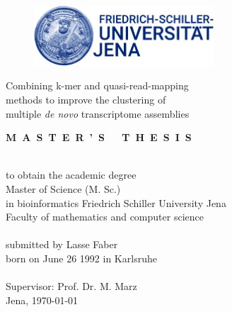 \documentclass[12pt,a4paper,english]{article}
\begin{document}
	\pagestyle{empty}
	\begin{titlepage}
		\begin{center}
			\begin{figure}[H]
				\centering
				\includegraphics[width=0.6\textwidth]{images/Logo-Paket_Uni_Jena/Logo_Uni_Jena/Bild-Wort-Marke/jpg/UniJena_BildWortMarke_blue.jpg}
			\end{figure}
	
			\vspace*{2cm}
			\begin{Large}
				Combining k-mer and quasi-read-mapping\\
				methods to improve the clustering of\\
				multiple \textit{de novo} transcriptome assemblies\\
			\end{Large}

			\vspace{2cm}
			\begin{Large}
			\textbf{M~A~S~T~E~R~'~S~~~T~H~E~S~I~S}\\
			\end{Large}
			~\\
			to obtain the academic degree\\
			Master of Science (M. Sc.)\\
			in bioinformatics
			\vfill
			Friedrich Schiller University Jena\\
			Faculty of mathematics and computer science\\
			~\\
			submitted by Lasse Faber\\
			born on June 26 1992 in Karlsruhe\\
			~\\
			Supervisor: Prof. Dr. M. Marz\\
			Jena, \today
		\end{center}
	\end{titlepage}

\end{document}
